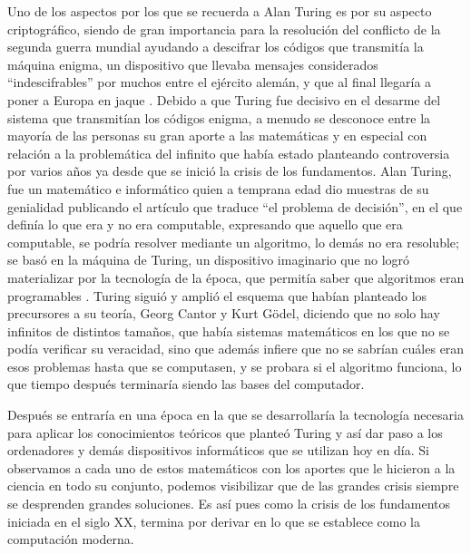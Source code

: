 \documentclass[12pt, letter]{article}
\begin{document}
\setlength{\parindent}{31pt}
Uno de los aspectos por los que se recuerda a Alan Turing es por su aspecto criptográfico, siendo de gran importancia para la resolución del conflicto de la segunda guerra mundial ayudando a descifrar los códigos que transmitía la máquina enigma, un dispositivo que llevaba mensajes considerados “indescifrables” por muchos entre el ejército alemán, y que al final llegaría a poner a Europa en jaque \parencite{enigma}. Debido a que Turing fue decisivo en el desarme del sistema que transmitían los códigos enigma, a menudo se desconoce entre la mayoría de las personas su gran aporte a las matemáticas y en especial con relación a la problemática del infinito que había estado planteando controversia por varios años ya desde que se inició la crisis de los fundamentos. 
\setlength{\parindent}{31pt}
Alan Turing, fue un matemático e informático quien a temprana edad dio muestras de su genialidad publicando el artículo que traduce “el problema de decisión”, en el que definía lo que era y no era computable, expresando que aquello que era computable, se podría resolver mediante un algoritmo, lo demás no era resoluble; se basó en la máquina de Turing, un dispositivo imaginario que no logró materializar por la tecnología de la época, que permitía saber que algoritmos eran programables \parencite{Alanturing}.  Turing siguió y amplió el esquema que habían planteado los precursores a su teoría, Georg Cantor y Kurt Gödel, diciendo que no solo hay infinitos de distintos tamaños, que había sistemas matemáticos en los que no se podía verificar su veracidad, sino que además infiere que no se sabrían cuáles eran esos problemas hasta que se computasen, y se probara si el algoritmo funciona, lo que tiempo después terminaría siendo las bases del computador.

\setlength{\parindent}{31pt}
Después se entraría en una época en la que se desarrollaría la tecnología necesaria para aplicar los conocimientos teóricos que planteó Turing y así dar paso a los ordenadores y demás dispositivos informáticos que se utilizan hoy en día. Si observamos a cada uno de estos matemáticos con los aportes que le hicieron a la ciencia en todo su conjunto, podemos visibilizar que de las grandes crisis siempre se desprenden grandes soluciones. Es así pues como la crisis de los fundamentos iniciada en el siglo XX, termina por derivar en lo que se establece como la computación moderna.



\printbibliography[title={Referencias}]
\end{document}
